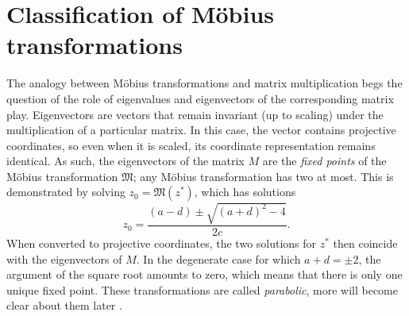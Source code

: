\section{Classification of Möbius transformations}
The analogy between Möbius transformations and matrix multiplication begs the question of the role of eigenvalues and eigenvectors of the corresponding matrix play. Eigenvectors are vectors that remain invariant (up to scaling) under the multiplication of a particular matrix. In this case, the vector contains projective coordinates, so even when it is scaled, its coordinate representation remains identical. As such, the eigenvectors of the matrix \(M\) are the \emph{fixed points} of the Möbius transformation \(\mathfrak{M}\); any Möbius transformation has two at most. This is demonstrated by solving \(z_0 = \mathfrak{M}(z^*)\), which has solutions
\[ z_0 = \frac{(a - d) \pm \sqrt{(a + d)^2 - 4}}{2c}.\]
When converted to projective coordinates, the two solutions for \(z^*\) then coincide with the eigenvectors of \(M\). In the degenerate case for which \(a + d = \pm2\), the argument of the square root amounts to zero, which means that there is only one unique fixed point. These transformations are called \emph{parabolic}, more will become clear about them later \cite{Needham1997}.

